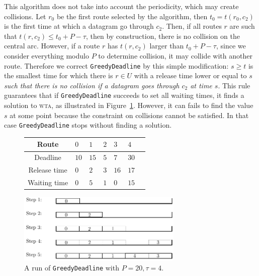 \documentclass[a4paper,10pt]{journal}
\newcommand\greedydeadline{\texttt{GreedyDeadline}\xspace}
\newcommand\wta{\textsc{wta}\xspace}
\begin{document}
    This algorithm does not take into account the periodicity, which may create collisions. Let $r_0$ be the first route selected by the algorithm, then $t_0 = t(r_0,c_2)$ is the first time at which a datagram go through $c_2$.
	Then, if all routes $r$ are such that $t(r, c_2) \leq t_0 + P - \tau$, 
	then by construction, there is no collision on the central arc.
      However, if a route $r$ has $t(r, c_2)$ larger than $t_0 + P - \tau$, since we consider everything modulo $P$ to determine collision, it may collide with another route. Therefore we correct \greedydeadline by this simple modification: $s \geq t$ is the smallest time for which there is $r \in U$ with a release time lower or equal to $s$ \emph{such that there is no collision if a datagram goes through $c_2$ at time $s$}. This rule guarantees that if \greedydeadline succeeds to set all waiting times, it finds a solution to \wta, as illustrated in Figure~\ref{fig:greedydeadline}. However, it can fails to find the value $s$ at some point because the constraint on collisions cannot be satisfied. In that case \greedydeadline stops without finding a solution.
    
    \begin{figure}
          \begin{center}
   \begin{tabularx}{0.7\textwidth}{|c|X|X|X|X|X|X|}
    \hline
     Route& $0$ & $1$ & $2$& $3$ & $4$\\
    \hline
    Deadline & $10$ &$15$&$5$&$7$&$30$\\
    \hline
     Release time & $0$ &$2$&$3$&$16$&$17$\\
    \hline
    Waiting time & $0$ &$5$&$1$&$0$&$15$\\
    \hline
      \end{tabularx}
      
      
      \includegraphics[width=0.7\textwidth]{examplegreedy.pdf}
      \caption{A run of \greedydeadline with $P = 20, \tau = 4$.}
           \label{fig:greedydeadline}
      \end{center}
      
    \end{figure}
\end{document}
